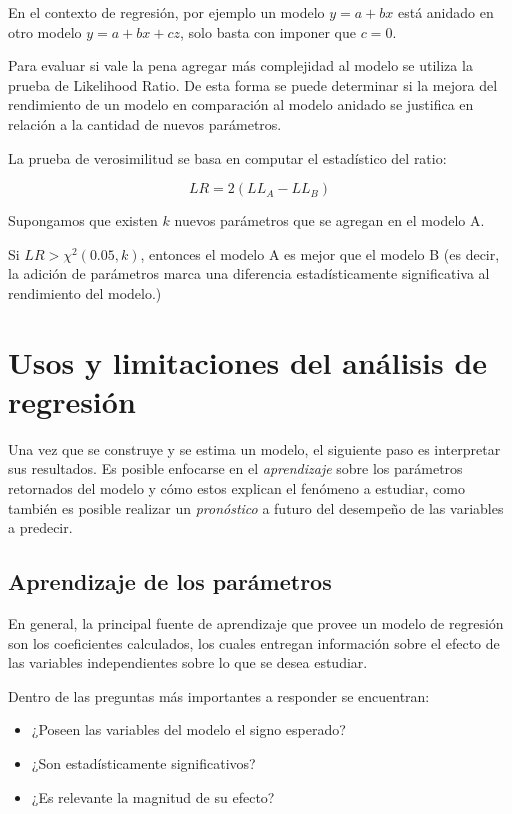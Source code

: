 \documentclass[
]{book}
\providecommand{\tightlist}{%
  \setlength{\itemsep}{0pt}\setlength{\parskip}{0pt}}
\begin{document}
En el contexto de regresión, por ejemplo un modelo \(y=a+bx\) está anidado
en otro modelo \(y=a+bx+cz\), solo basta con imponer que \(c=0\).

Para evaluar si vale la pena agregar más complejidad al modelo se
utiliza la prueba de Likelihood Ratio. De esta forma se puede determinar
si la mejora del rendimiento de un modelo en comparación al modelo
anidado se justifica en relación a la cantidad de nuevos parámetros.

La prueba de verosimilitud se basa en computar el estadístico del ratio:

\[LR = 2(LL_A - LL_B)\]

Supongamos que existen \(k\) nuevos parámetros que se agregan en el modelo
A.

Si \(LR > \chi^2(0.05, k)\), entonces el modelo A es mejor que el modelo B
(es decir, la adición de parámetros marca una diferencia
estadísticamente significativa al rendimiento del modelo.)

\hypertarget{usos-y-limitaciones-del-anuxe1lisis-de-regresiuxf3n-1}{%
\section{Usos y limitaciones del análisis de regresión}\label{usos-y-limitaciones-del-anuxe1lisis-de-regresiuxf3n-1}}

Una vez que se construye y se estima un modelo, el siguiente paso es
interpretar sus resultados. Es posible enfocarse en el \emph{aprendizaje}
sobre los parámetros retornados del modelo y cómo estos explican el
fenómeno a estudiar, como también es posible realizar un \emph{pronóstico} a
futuro del desempeño de las variables a predecir.

\hypertarget{aprendizaje-de-los-paruxe1metros-1}{%
\subsection{Aprendizaje de los parámetros}\label{aprendizaje-de-los-paruxe1metros-1}}

En general, la principal fuente de aprendizaje que provee un modelo de
regresión son los coeficientes calculados, los cuales entregan
información sobre el efecto de las variables independientes sobre lo que
se desea estudiar.

Dentro de las preguntas más importantes a responder se encuentran:

\begin{itemize}
\tightlist
\item
  ¿Poseen las variables del modelo el signo esperado?
\item
  ¿Son estadísticamente significativos?
\item
  ¿Es relevante la magnitud de su efecto?
\end{itemize}
\end{document}
